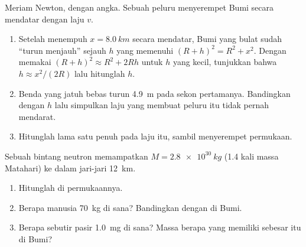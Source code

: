 \begin{exercise}[$\star\star\star$]\label{exo:g10:universal-gravitation:13}
Meriam Newton, dengan angka. Sebuah peluru menyerempet Bumi secara
mendatar dengan laju $v$.
\begin{enumerate}
  \item Setelah menempuh $x = \qty{8.0}{km}$ secara mendatar, Bumi yang
        bulat sudah ``turun menjauh'' sejauh $h$ yang memenuhi
        $(R + h)^2 = R^2 + x^2$. Dengan memakai
        $(R + h)^2 \approx R^2 + 2Rh$ untuk $h$ yang kecil, tunjukkan
        bahwa $h \approx x^2 / (2R)$ lalu hitunglah $h$.
  \item Benda yang jatuh bebas turun \qty{4.9}{m} pada sekon
        pertamanya. Bandingkan dengan $h$ lalu simpulkan laju yang
        membuat peluru itu tidak pernah mendarat.
  \item Hitunglah lama satu  penuh pada laju itu, sambil
        menyerempet permukaan.
\end{enumerate}
\end{exercise}

\begin{exercise}[$\star\star\star$]\label{exo:g10:universal-gravitation:14}
Sebuah bintang neutron memampatkan $M = \qty{2.8e30}{kg}$ (1.4 kali
massa Matahari) ke dalam jari-jari \qty{12}{km}.
\begin{enumerate}
  \item Hitunglah  di permukaannya.
  \item Berapa  manusia \qty{70}{kg} di sana? Bandingkan dengan
         di Bumi.
  \item Berapa  sebutir pasir \qty{1.0}{mg} di sana? Massa berapa
        yang memiliki  sebesar itu di Bumi?
\end{enumerate}
\end{exercise}

